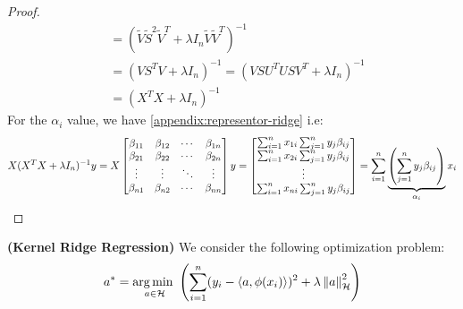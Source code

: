 \begin{proof}
\begin{equation*}
\begin{aligned}
        &= (\tilde{V}\tilde{S}^2\tilde{V}^{T} + \lambda I_n \tilde{V}\tilde{V}^T)^{-1} \\
        &= (VS^TV + \lambda I_n)^{-1} = (VSU^TUSV^T + \lambda I_n)^{-1} \\
        &= (X^TX + \lambda I_n)^{-1}
    \end{aligned}
    \end{equation*}
    For the $\alpha_i$ value, we have \ref{appendix:representor-ridge} i.e:
    \begin{equation*}
        X(X^TX + \lambda I_n)^{-1}y = X\begin{bmatrix}
            \beta_{11} & \beta_{12} & \cdots & \beta_{1n} \\
            \beta_{21} & \beta_{22} & \cdots & \beta_{2n} \\
            \vdots & \vdots & \ddots & \vdots \\
            \beta_{n1} & \beta_{n2} & \cdots & \beta_{nn} \\
        \end{bmatrix}y = \begin{bmatrix}
        \sum^n_{i=1} x_{1i} \sum^n_{j=1} y_j\beta_{ij} \\
        \sum^n_{i=1} x_{2i} \sum^n_{j=1} y_j\beta_{ij} \\
        \vdots \\
        \sum^n_{i=1} x_{ni} \sum^n_{j=1} y_j\beta_{ij} \\
    \end{bmatrix} = \sum^n_{i=1}\underbrace{\left( \sum^n_{j=1}y_j\beta_{ij} \right)}_{\alpha_i}x_i
    \end{equation*}
\end{proof}

\begin{definition}{\textbf{(Kernel Ridge Regression)}}
    We consider the following optimization problem:
    \begin{equation*}
        a^* = \underset{a\in\mathcal{H}}{\arg\min \ }\left( \sum^n_{i=1}(y_i-\left\langle a, \phi(x_i) \right\rangle)^2 + \lambda\left\lVert a\right\rVert^2_\mathcal{H} \right)
    \end{equation*}
\end{definition}

